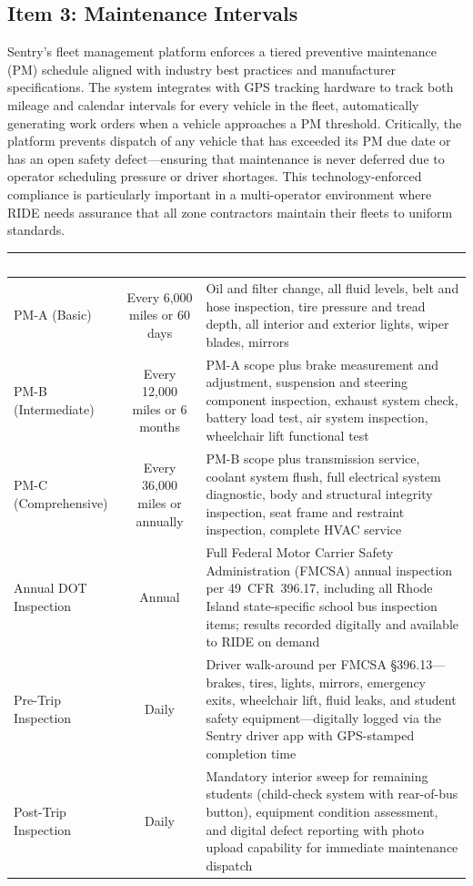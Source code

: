 \subsection{Item 3: Maintenance Intervals}

Sentry's fleet management platform enforces a tiered preventive maintenance (PM) schedule aligned with industry best practices and manufacturer specifications. The system integrates with GPS tracking hardware to track both mileage and calendar intervals for every vehicle in the fleet, automatically generating work orders when a vehicle approaches a PM threshold. Critically, the platform prevents dispatch of any vehicle that has exceeded its PM due date or has an open safety defect---ensuring that maintenance is never deferred due to operator scheduling pressure or driver shortages. This technology-enforced compliance is particularly important in a multi-operator environment where RIDE needs assurance that all zone contractors maintain their fleets to uniform standards.

\vspace{0.3cm}

\begin{tabularx}{\textwidth}{|X|c|X|}
\hline
\rowcolor{tableHeader}
\textcolor{white}{\textbf{Service Type}} &
\textcolor{white}{\textbf{Interval}} &
\textcolor{white}{\textbf{Scope}} \\
\hline
PM-A (Basic) & Every 6,000 miles or 60 days & Oil and filter change, all fluid levels, belt and hose inspection, tire pressure and tread depth, all interior and exterior lights, wiper blades, mirrors \\ \hline
PM-B (Intermediate) & Every 12,000 miles or 6 months & PM-A scope plus brake measurement and adjustment, suspension and steering component inspection, exhaust system check, battery load test, air system inspection, wheelchair lift functional test \\ \hline
PM-C (Comprehensive) & Every 36,000 miles or annually & PM-B scope plus transmission service, coolant system flush, full electrical system diagnostic, body and structural integrity inspection, seat frame and restraint inspection, complete HVAC service \\ \hline
Annual DOT Inspection & Annual & Full Federal Motor Carrier Safety Administration (FMCSA) annual inspection per 49~CFR~396.17, including all Rhode Island state-specific school bus inspection items; results recorded digitally and available to RIDE on demand \\ \hline
Pre-Trip Inspection & Daily & Driver walk-around per FMCSA \S 396.13---brakes, tires, lights, mirrors, emergency exits, wheelchair lift, fluid leaks, and student safety equipment---digitally logged via the Sentry driver app with GPS-stamped completion time \\ \hline
Post-Trip Inspection & Daily & Mandatory interior sweep for remaining students (child-check system with rear-of-bus button), equipment condition assessment, and digital defect reporting with photo upload capability for immediate maintenance dispatch \\ \hline
\end{tabularx}


